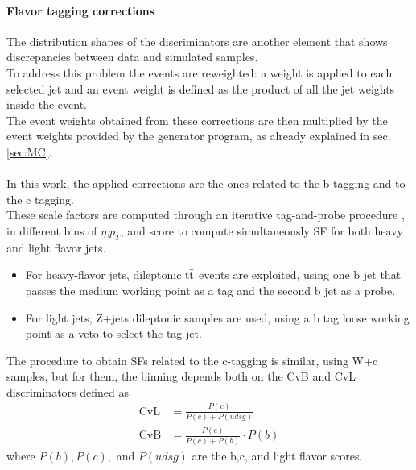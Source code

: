 \paragraph*{Flavor tagging corrections}\label{par:tag_corr}
The distribution shapes of the \DeepJet discriminators are another element that shows discrepancies between data and simulated samples.\\
To address this problem the events are reweighted:
a weight is applied to each selected jet and an event weight is defined as the product of all the jet weights inside the event.\\
The event weights obtained from these corrections are then multiplied by the event weights provided by the generator program, as already explained in sec. \ref{sec:MC}. 
\\
\\
In this work, the applied corrections are the ones related to the b tagging and to the c tagging.\\
These scale factors are computed through an iterative tag-and-probe procedure \cite{2021B-tagging2018.}, in different bins of $\eta$,$p_T$, and \DeepJet score to compute simultaneously SF for both heavy and light flavor jets.
\begin{itemize}
    \item For heavy-flavor jets, dileptonic ${{\text{t}}{\bar{\text{t}}}}$ events are exploited, using one b jet that passes the medium working point as a tag and the second b jet as a probe.
    \item For light jets, Z+jets dileptonic samples are used, using a b tag loose working point as a veto to select the tag jet.
\end{itemize}
The procedure to obtain SFs related to the c-tagging is similar, using W+c samples, but for them, the binning depends both on the CvB and CvL discriminators defined as
\begin{equation}
\begin{aligned}
     \text{CvL} &= \frac{P(c)}{P(c) + P(udsg)}\\
     \text{CvB} &= \frac{P(c)}{P(c) + P(b)} \cdot P(b) 
\end{aligned}
\end{equation}
where $P(b), P(c),$ and $P(udsg)$ are the b,c, and light flavor \DeepJet scores.



